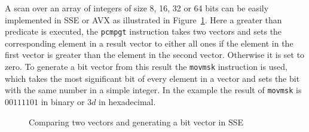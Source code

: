 A scan over an array of integers of size 8, 16, 32 or 64 bits can be
easily implemented in SSE or AVX as illustrated in
Figure~\ref{fig:simplecomparesse}. Here a greater than predicate is executed,
the \texttt{pcmpgt} instruction takes two vectors and sets the corresponding
element in a result vector to either all ones if the element in the first
vector is greater than the element in the second vector. Otherwise it is set to
zero. To generate a bit vector from this result the \texttt{movmsk} instruction
is used, which takes the most significant bit of every element in a vector and
sets the bit with the same number in a simple integer. In the example the
result of \texttt{movmsk} is $00111101$ in binary or $3d$ in hexadecimal.

\begin{figure}\center
{}
\caption{Comparing two vectors and generating a bit vector in SSE}
\label{fig:simplecomparesse}
\end{figure}

